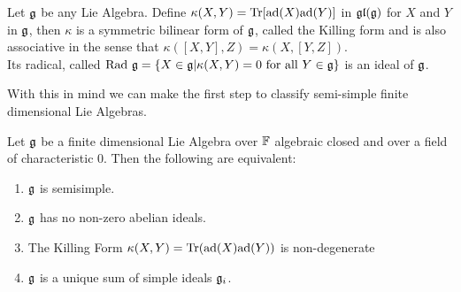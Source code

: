 \begin{defi}
	Let $\mathfrak{g}$ be any Lie Algebra. Define $\kappa(X,Y)= \text{Tr} [\text{ad}(X)\text{ad}(Y)]$ in $\mathfrak{gl}(\mathfrak{g})$ for $X$ and $Y$ in $\mathfrak{g}$, then $\kappa$ is a symmetric bilinear form of $\mathfrak{g}$, called the Killing form and is also associative in the sense that $\kappa([X,Y],Z)=\kappa(X,[Y,Z])$.\\
	Its radical, called $\text{Rad } \mathfrak{g} = \{X \in \mathfrak{g} | \kappa(X,Y)=0 \text{ for all } Y \in \mathfrak{g}\}$ is an ideal of $\mathfrak{g}$. 
	\label{Killing Form}
\end{defi}
With this in mind we can make the first step to classify semi-simple finite dimensional Lie Algebras.
\begin{teo}
Let $\mathfrak{g}$ be a finite dimensional Lie Algebra over $\mathbb{F}$ algebraic closed and over a field of characteristic $0$. Then the following are equivalent:
\begin{enumerate}
	\item $\mathfrak{g}$ is semisimple.
	\item $\mathfrak{g}$ has no non-zero abelian ideals.
	\item The Killing Form $\kappa(X,Y)=\text{Tr}(\text{ad}(X)\text{ad}(Y))$ is non-degenerate
	\item $\mathfrak{g}$ is a unique sum of simple ideals $\mathfrak{g}_i$.
\end{enumerate}
\end{teo}
